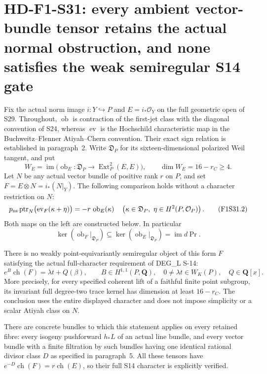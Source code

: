 \section[HD-F1-S31: ambient bundle tensors retain the normal obstruction]{HD-F1-S31: every ambient vector-bundle tensor retains the actual normal obstruction, and none satisfies the weak semiregular S14 gate}
\label{sec:f1-norm-fourfold-bundle-tensor}

Fix the actual norm image $i:Y\hookrightarrow P$ and
$E=i_*\mathcal O_Y$ on the full geometric open of S29.
Throughout, $\operatorname{ob}$ is contraction of the
first-jet class with the diagonal convention of S24,
whereas $\operatorname{ev}$ is the Hochschild
characteristic map in the Buchweitz--Flenner
Atiyah--Chern convention. Their exact sign relation
is established in paragraph~2.
Write $\mathfrak D_P$ for its sixteen-dimensional
polarized Weil tangent, and put
\[
 W_E=\operatorname{im}\bigl(
       \operatorname{ob}_E:\mathfrak D_P
                         \longrightarrow\operatorname{Ext}^2_P(E,E)\bigr),
 \qquad \dim W_E=16-r_C\ge4.
 \tag{F1S31.1}
\]
Let $N$ be any actual vector bundle of positive rank $r$ on
$P$, and set $F=E\otimes N=i_*(N|_Y)$. The following
comparison holds without a character restriction on $N$:
\[
 p_{\rm ns}\operatorname{ptr}_N
       \bigl(\operatorname{ev}_{F}(\kappa+\eta)\bigr)
       =-r\,\operatorname{ob}_E(\kappa)
 \quad
 \left(\kappa\in\mathfrak D_P,\ 
                  \eta\in H^2(P,\mathcal O_P)\right).
 \tag{F1S31.2}
\]
Both maps on the left are constructed below. In particular
\[
 \ker(\operatorname{ob}_F|_{\mathfrak D_P})
            \subseteq\ker(\operatorname{ob}_E|_{\mathfrak D_P})
            =\operatorname{im}d\operatorname{Pr}.
 \tag{F1S31.3}
\]

There is no weakly point-equivariantly semiregular object
of this form $F$ satisfying the actual full-character
requirement of DEG\_L S-14:
\[
 e^B\operatorname{ch}(F)=\lambda t+Q(\beta),\qquad
 B\in H^{1,1}(P,\mathbf Q),\quad
 0\ne\lambda t\in W_K(P),\quad Q\in\mathbf Q[x].
 \tag{F1S31.4}
\]
More precisely, for every specified coherent lift of a
faithful finite point subgroup, its invariant full
degree-two trace kernel has dimension at least $16-r_C$.
The conclusion uses the entire displayed character and
does not impose simplicity or a scalar Atiyah class on $N$.

There are concrete bundles to which this statement
applies on every retained fibre: every isogeny pushforward
$h_*L$ of an actual line bundle, and every vector bundle
with a finite filtration by such bundles having one
identical rational divisor class $D$ as specified in
paragraph~5. All these tensors have
$e^{-D}\operatorname{ch}(F)=r\operatorname{ch}(E)$,
so their full S14 character is explicitly verified.

